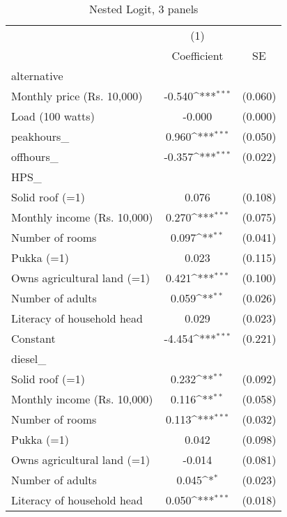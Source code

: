 \begin{table}[htbp]\centering
\def\sym#1{\ifmmode^{#1}\else\(^{#1}\)\fi}
\caption{Nested Logit, 3 panels}
\begin{tabular}{l*{1}{cc}}
\toprule
                    &\multicolumn{1}{c}{(1)}         &            \\
                    & Coefficient         &          SE\\
\midrule
alternative         &                     &            \\
Monthly price (Rs. 10,000)&      -0.540\sym{***}&     (0.060)\\
Load (100 watts)    &      -0.000         &     (0.000)\\
peakhours\_          &       0.960\sym{***}&     (0.050)\\
offhours\_           &      -0.357\sym{***}&     (0.022)\\
\midrule
HPS\_                &                     &            \\
Solid roof (=1)     &       0.076         &     (0.108)\\
Monthly income (Rs. 10,000)&       0.270\sym{***}&     (0.075)\\
Number of rooms     &       0.097\sym{**} &     (0.041)\\
Pukka (=1)          &       0.023         &     (0.115)\\
Owns agricultural land (=1)&       0.421\sym{***}&     (0.100)\\
Number of adults    &       0.059\sym{**} &     (0.026)\\
Literacy of household head&       0.029         &     (0.023)\\
Constant            &      -4.454\sym{***}&     (0.221)\\
\midrule
diesel\_             &                     &            \\
Solid roof (=1)     &       0.232\sym{**} &     (0.092)\\
Monthly income (Rs. 10,000)&       0.116\sym{**} &     (0.058)\\
Number of rooms     &       0.113\sym{***}&     (0.032)\\
Pukka (=1)          &       0.042         &     (0.098)\\
Owns agricultural land (=1)&      -0.014         &     (0.081)\\
Number of adults    &       0.045\sym{*}  &     (0.023)\\
Literacy of household head&       0.050\sym{***}&     (0.018)\\

\end{tabular}
\end{table}
